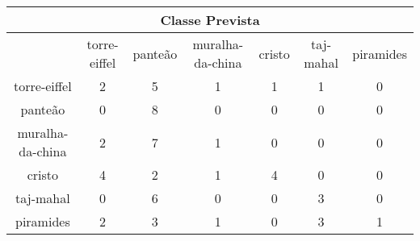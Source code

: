 \begin{tabular}{|c|c|c|c|c|c|c|}
\hline
\multicolumn{7}{|c|}{Classe Prevista}\\
\hline
 & torre-eiffel & panteão & muralha-da-china & cristo & taj-mahal & piramides\\
torre-eiffel & 2 & 5 & 1 & 1 & 1 & 0\\
panteão & 0 & 8 & 0 & 0 & 0 & 0\\
muralha-da-china & 2 & 7 & 1 & 0 & 0 & 0\\
cristo & 4 & 2 & 1 & 4 & 0 & 0\\
taj-mahal & 0 & 6 & 0 & 0 & 3 & 0\\
piramides & 2 & 3 & 1 & 0 & 3 & 1\\
\hline
\end{tabular}
